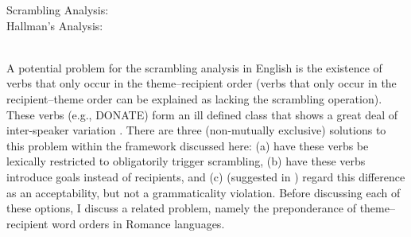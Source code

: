 \begin{exe}
\ex \label{ex:comparison-trees}
\begin{xlist}
\ex Scrambling Analysis: \\
 \ex\label{ex:hallman-tree} Hallman's Analysis: \\
\\
\end{xlist}
\end{exe}%

A potential problem for the scrambling analysis in English is the existence of verbs that only occur in the theme--recipient order (verbs that only occur in the recipient--theme order can be explained as lacking the scrambling operation). These verbs (e.g., DONATE) form an ill defined class that shows a great deal of inter-speaker variation \citep{Levin.1993}. There are three (non-mutually exclusive) solutions to this problem within the framework discussed here: (a) have these verbs be lexically restricted to obligatorily trigger scrambling, (b) have these verbs introduce goals instead of recipients, and (c) (suggested in \cite{Levin.2010}) regard this difference as an acceptability, but not a grammaticality violation. Before discussing each of these options, I discuss a related problem, namely the preponderance of theme--recipient word orders in Romance languages.

